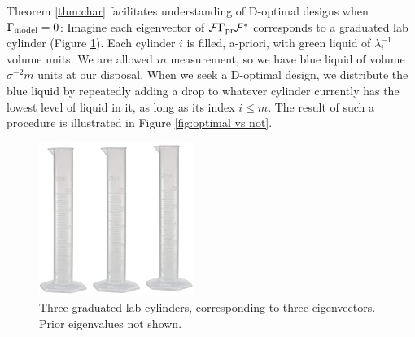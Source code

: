 Theorem \ref{thm:char} facilitates understanding of D-optimal designs
when $\Gamma_{\textup{model}} = 0$: Imagine each eigenvector of $\mathcal{F} \Gamma_{\textup{pr}} \mathcal{F}^*$
corresponds to a graduated lab cylinder (Figure
\ref{fig:cylinder}). Each cylinder $i$ is filled, a-priori, with green
liquid of $\lambda_i^{-1}$ volume units. We are allowed $m$
measurement, so we have blue liquid of volume $\sigma^{-2}m$ units at
our disposal. When we seek a D-optimal design, we distribute the blue
liquid by repeatedly adding a drop to whatever cylinder currently has
the lowest level of liquid in it, as long as its index $i \leq m$. The
result of such a procedure is illustrated in Figure \ref{fig:optimal
  vs not}.

\begin{figure}%
    \centering
    \includegraphics[width=5cm, height=5cm]{cylinders.jpg}
    \caption{Three graduated lab cylinders, corresponding to three
      eigenvectors. Prior eigenvalues not shown.}
    \label{fig:cylinder}
\end{figure}


